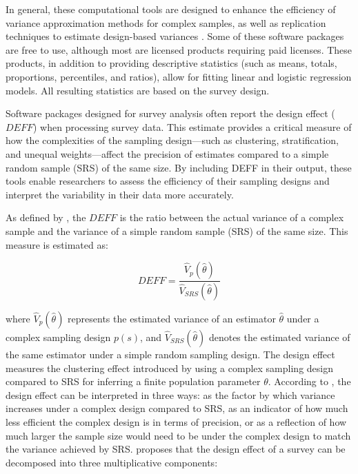 \documentclass[
  12pt,
]{book}
\begin{document}
In general, these computational tools are designed to enhance the efficiency of variance approximation methods for complex samples, as well as replication techniques to estimate design-based variances \citep{Westat_2007}. Some of these software packages are free to use, although most are licensed products requiring paid licenses. These products, in addition to providing descriptive statistics (such as means, totals, proportions, percentiles, and ratios), allow for fitting linear and logistic regression models. All resulting statistics are based on the survey design.

Software packages designed for survey analysis often report the design effect (\(DEFF\)) when processing survey data. This estimate provides a critical measure of how the complexities of the sampling design---such as clustering, stratification, and unequal weights---affect the precision of estimates compared to a simple random sample (SRS) of the same size. By including DEFF in their output, these tools enable researchers to assess the efficiency of their sampling designs and interpret the variability in their data more accurately.

As defined by \citet[p.~258]{Kish_1965}, the \(DEFF\) is the ratio between the actual variance of a complex sample and the variance of a simple random sample (SRS) of the same size. This measure is estimated as:

\[
DEFF = \frac{\widehat {V}_p \left( \hat{\theta} \right)}{\widehat {V}_{SRS}(\hat{\theta})}
\]

where \(\widehat {V}_p \left( \hat{\theta} \right)\) represents the estimated variance of an estimator \(\hat{\theta}\) under a complex sampling design \(p(s)\), and \(\widehat {V}_{SRS}(\hat{\theta})\) denotes the estimated variance of the same estimator under a simple random sampling design. The design effect measures the clustering effect introduced by using a complex sampling design compared to SRS for inferring a finite population parameter \(\theta\). According to \citet[p.~49]{United_Nations_2008}, the design effect can be interpreted in three ways: as the factor by which variance increases under a complex design compared to SRS, as an indicator of how much less efficient the complex design is in terms of precision, or as a reflection of how much larger the sample size would need to be under the complex design to match the variance achieved by SRS. \citet{Park_2003} proposes that the design effect of a survey can be decomposed into three multiplicative components:
\end{document}
